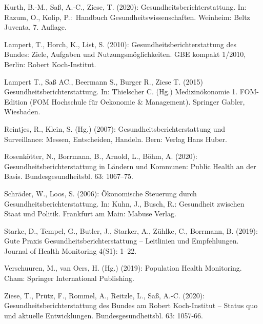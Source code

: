 \documentclass{article}
\begin{document}
Kurth, B.-M., Saß, A.-C., Ziese, T. (2020): Gesundheitsberichterstattung. In: Razum, O., Kolip, P.: Handbuch Gesundheitswissenschaften. Weinheim: Beltz Juventa, 7. Auflage.


Lampert, T., Horch, K., List, S. (2010): Gesundheitsberichterstattung des Bundes: Ziele, Aufgaben und Nutzungsmöglichkeiten. GBE kompakt 1/2010, Berlin: Robert Koch-Institut.


Lampert T., Saß AC., Beermann S., Burger R., Ziese T. (2015) Gesundheitsberichterstattung. In: Thielscher C. (Hg.) Medizinökonomie 1. FOM-Edition (FOM Hochschule für Oekonomie \& Management). Springer Gabler, Wiesbaden.

Reintjes, R., Klein, S. (Hg.) (2007): Gesundheitsberichterstattung und Surveillance: Messen, Entscheiden, Handeln. Bern: Verlag Hans Huber.


Rosenkötter, N., Borrmann, B., Arnold, L., Böhm, A. (2020): Gesundheitsberichterstattung in Ländern und Kommunen: Public Health an der Basis. Bundesgesundheitsbl. 63: 1067–75.


Schräder, W., Loos, S. (2006): Ökonomische Steuerung durch Gesundheitsberichterstattung. In: Kuhn, J., Busch, R.: Gesundheit zwischen Staat und Politik. Frankfurt am Main: Mabuse Verlag.


Starke, D., Tempel, G., Butler, J., Starker, A., Zühlke, C., Borrmann, B. (2019): Gute Praxis Gesundheitsberichterstattung – Leitlinien und Empfehlungen. Journal of Health Monitoring 4(S1): 1–22.


Verschuuren, M., van Oers, H. (Hg.) (2019): Population Health Monitoring. Cham: Springer International Publishing.


Ziese, T., Prütz, F., Rommel, A., Reitzle, L., Saß, A.-C. (2020): Gesundheitsberichterstattung des Bundes am Robert Koch-Institut – Status quo und aktuelle Entwicklungen. Bundesgesundheitsbl. 63: 1057-66.
\end{document}
